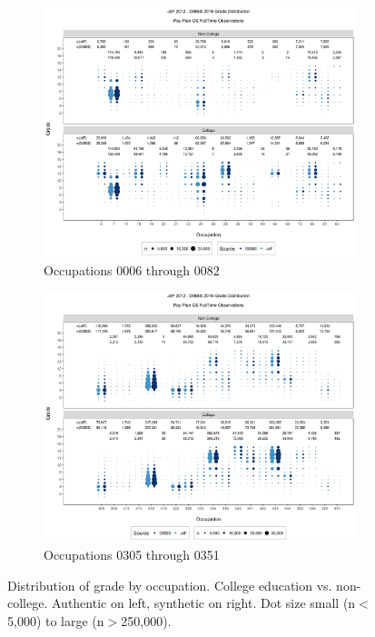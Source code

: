 \documentclass[10pt, letterpaper]{article}
\begin{document}
\begin{spacing}{1.0}
\clearpage

\begin{figure}[]
    \centering
    \begin{subfigure}{1\textwidth}
        \centering
        \includegraphics[width=6in, trim={0 0.55in 0 0.75in}, clip]{JdFDIBBSGSFullTimeGradeCollegeOccupation1.png}
        \caption{Occupations 0006 through 0082}
        \vspace{10pt}
    \end{subfigure}
    \begin{subfigure}{1\textwidth}
        \centering
        \includegraphics[width=6in, trim={0 0.55in 0 0.75in}, clip]{JdFDIBBSGSFullTimeGradeCollegeOccupation81.png}
        \caption{Occupations 0305 through 0351}
    \end{subfigure}
    \caption{Distribution of grade by occupation.  College education vs. non-college.  Authentic on left, synthetic on right.  Dot size small (n$<$5,000) to large (n$>$250,000).}
    \label{figure:JdFDIBBSGSFullTimeGradeCollegeOccupation}
\end{figure}


\end{spacing}
\end{document}
